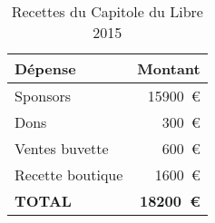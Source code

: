 \begin{table}
\begin{center}
    \caption{Recettes du Capitole du Libre 2015}\label{tab_recettes}
    \begin{tabular}{|l|r|}
        \hline \textbf{Dépense} & \textbf{Montant} \\
        \hline Sponsors & \SI{15900}{€} \\
        \hline Dons & \SI{300}{€} \\
        \hline Ventes buvette & \SI{600}{€} \\
        \hline Recette boutique & \SI{1600}{€} \\
        \hline
        \hline \textbf{TOTAL} & \textbf{\SI{18200}{€}} \\
        \hline
    \end{tabular}
\end{center}
\end{table}